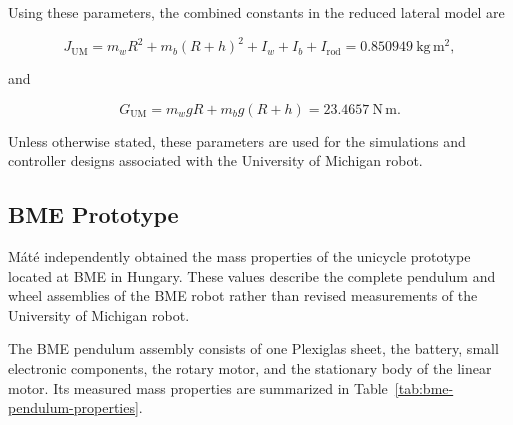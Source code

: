 Using these parameters, the combined constants in the reduced lateral model are

\begin{equation}
J_{\mathrm{UM}}
=
m_wR^2
+
m_b(R+h)^2
+
I_w
+
I_b
+
I_{\mathrm{rod}}
=
0.850949~\mathrm{kg\,m^2},
\end{equation}

and

\begin{equation}
G_{\mathrm{UM}}
=
m_wgR
+
m_bg(R+h)
=
23.4657~\mathrm{N\,m}.
\end{equation}

Unless otherwise stated, these parameters are used for the simulations and controller designs associated with the University of Michigan robot.

\subsection{BME Prototype}

Máté independently obtained the mass properties of the unicycle prototype located at BME in Hungary. These values describe the complete pendulum and wheel assemblies of the BME robot rather than revised measurements of the University of Michigan robot.

The BME pendulum assembly consists of one Plexiglas sheet, the battery, small electronic components, the rotary motor, and the stationary body of the linear motor. Its measured mass properties are summarized in Table~\ref{tab:bme-pendulum-properties}.

